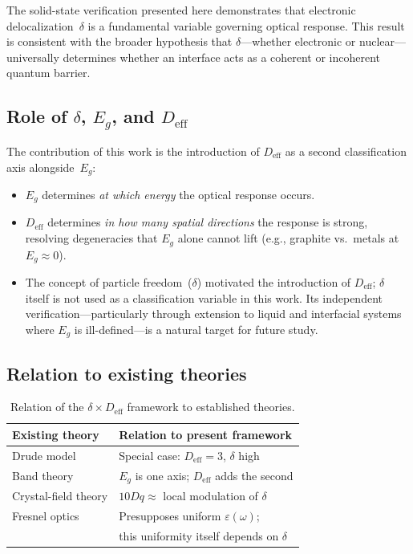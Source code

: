 \documentclass[twocolumn,showpacs,preprintnumbers,amsmath,amssymb,prb]{revtex4-2}
\begin{document}
The solid-state verification presented here demonstrates that electronic
delocalization~$\delta$ is a fundamental variable governing optical
response. This result is consistent with the broader hypothesis that
$\delta$---whether electronic or nuclear---universally determines
whether an interface acts as a coherent or incoherent quantum barrier.

\subsection{Role of $\delta$, $E_g$, and $D_\mathrm{eff}$}

The contribution of this work is the introduction of $D_\mathrm{eff}$
as a second classification axis alongside~$E_g$:
\begin{itemize}
  \item $E_g$ determines \emph{at which energy} the optical response
    occurs.
  \item $D_\mathrm{eff}$ determines \emph{in how many spatial
    directions} the response is strong, resolving degeneracies that
    $E_g$ alone cannot lift (e.g., graphite vs.\ metals at
    $E_g \approx 0$).
  \item The concept of particle freedom~($\delta$) motivated the
    introduction of $D_\mathrm{eff}$; $\delta$ itself is not used as
    a classification variable in this work. Its independent
    verification---particularly through extension to liquid and
    interfacial systems where $E_g$ is ill-defined---is a natural
    target for future study.
\end{itemize}

\subsection{Relation to existing theories}

\begin{table}[h]
\caption{Relation of the $\delta \times D_\mathrm{eff}$ framework to
  established theories.}
\label{tab:existing}
\begin{ruledtabular}
\begin{tabular}{ll}
  Existing theory & Relation to present framework \\
  \hline
  Drude model & Special case: $D_\mathrm{eff} = 3$, $\delta$ high \\
  Band theory & $E_g$ is one axis; $D_\mathrm{eff}$ adds the second \\
  Crystal-field theory & $10Dq \approx$ local modulation of $\delta$ \\
  Fresnel optics & Presupposes uniform $\varepsilon(\omega)$; \\
   & this uniformity itself depends on $\delta$ \\
\end{tabular}
\end{ruledtabular}
\end{table}
\end{document}
